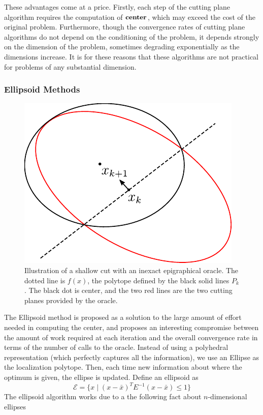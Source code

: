 These advantages come at a price. Firstly, each step of the cutting
plane algorithm requires the computation of ${\bf center}$, which may
exceed the cost of the original problem. Furthermore, though the
convergence rates of cutting plane algorithms do not depend on the
conditioning of the problem, it depends strongly on the dimension of
the problem, sometimes degrading exponentially as the dimensions
increase. It is for these reasons that these algorithms are not
practical for problems of any substantial dimension.


\subsubsection{Ellipsoid Methods}

\begin{figure} 
\begin{centering}
\includegraphics[scale=1.1]{cutting/ellipsoid.pdf}
\par\end{centering}
\caption{Illustration of a shallow cut with an inexact epigraphical oracle. The dotted
line is $f(x)$, the polytope defined by the black solid lines $P_k$. The black
dot is center, and the two red lines are the two cutting planes provided by the 
oracle.} \label{fig:approx-oracle}
\end{figure}

The Ellipsoid method \cite{bland1981ellipsoid} is proposed as a solution
to the large amount of effort needed in computing the center, and 
proposes an interesting compromise between the amount of work required
at each iteration and the overall convergence rate in terms of the
number of calls to the oracle. Instead of 
using a polyhedral representation
(which perfectly captures all the information), we use an Ellipse as the
localization polytope. Then, each time new information about where the
optimum is given, the ellipse is updated. Define an ellipsoid as
$$\mathcal{E} = \{ x \mid (x - \bar{x})^T E^{-1} (x - \bar{x}) \leq 1\}$$
The ellipsoid algorithm works due to a the following fact about $n$-dimensional ellipses

